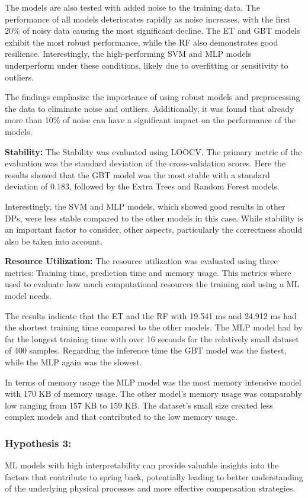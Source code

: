 The models are also tested with added noise to the training data.
The performance of all models deteriorates rapidly as noise increases, with the first 20\% of noisy data causing the
most significant decline.
The \ac{ET} and \ac{GBT} models exhibit the most robust performance, while the \ac{RF} also demonstrates good
resilience.
Interestingly, the high-performing SVM and MLP models underperform under these conditions, likely due to overfitting
or sensitivity to outliers.

The findings emphasize the importance of using robust models and preprocessing the data to eliminate noise and
outliers.
Additionally, it was found that already more than 10\% of noise can have a significant impact on the
performance of the models.


\textbf{Stability:} The Stability was evaluated using \ac{LOOCV}.
The primary metric of the evaluation was the standard deviation of the cross-validation scores.
Here the results showed that the \ac{GBT} model was the most stable with a standard deviation of 0.183,
followed by the Extra Trees and Random Forest models.

Interestingly, the SVM and MLP models, which showed good results in other \ac{DP}s, were less stable
compared to the other models in this case.
While stability is an important factor to consider, other aspects, particularly the correctness
should also be taken into account.

\textbf{Resource Utilization:} The resource utilization was evaluated using three metrics: Training time,
prediction time and memory usage.
This metrics where used to evaluate how much computational resources the training and using a \ac{ML} model needs.

The results indicate that the \ac{ET} and the \ac{RF} with 19.541 ms and 24.912 ms had the
shortest training time compared to the other models.
The \ac{MLP} model had by far the longest training time with over 16 seconds for the relatively small dataset of 400
samples.
Regarding the inference time the \ac{GBT} model was the fastest, while the MLP again was the slowest.

In terms of memory usage the \ac{MLP} model was the most memory intensive model with 170 KB of memory usage.
The other model's memory usage was comparably low ranging from 157 KB to 159 KB.
The dataset's small size created less complex models and that contributed to the low memory usage.

\subsubsection{Hypothesis 3:} ML models with high interpretability can provide valuable insights into the factors that
contribute to spring back, potentially leading to better understanding of the underlying physical processes and
more effective compensation strategies.

